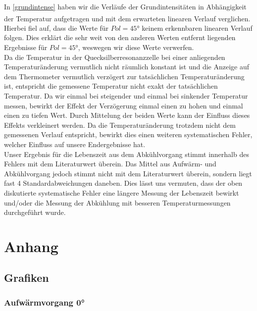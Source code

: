 \documentclass[12pt]{article}
\begin{document}
In \ref{grundintense} haben wir die Verläufe der Grundintensitäten in Abhängigkeit der Temperatur aufgetragen und mit dem erwarteten linearen Verlauf verglichen.\textsuperscript{\cite{HAMAMAMUTSU}} Hierbei fiel auf, dass die Werte für $Pol=45°$ keinem erkennbaren linearen Verlauf folgen. Dies erklärt die sehr weit von den anderen Werten entfernt liegenden Ergebnisse für $Pol=45°$, weswegen wir diese Werte verwerfen.\\

Da die Temperatur in der Quecksilberresonanzzelle bei einer anliegenden Temperaturänderung vermutlich nicht räumlich konstant ist und die Anzeige auf dem Thermometer vermutlich verzögert zur tatsächlichen Temperaturänderung ist, entspricht die gemessene Temperatur nicht exakt der tatsächlichen Temperatur. Da wir einmal bei steigender und einmal bei sinkender Temperatur messen, bewirkt der Effekt der Verzögerung einmal einen zu hohen und einmal einen zu tiefen Wert. Durch Mittelung der beiden Werte kann der Einfluss dieses Effekts verkleinert werden. Da die Temperaturänderung trotzdem nicht dem gemessenen Verlauf entspricht, bewirkt dies einen weiteren systematischen Fehler, welcher Einfluss auf unsere Endergebnisse hat.\\

Unser Ergebnis für die Lebenszeit aus dem Abkühlvorgang stimmt innerhalb des Fehlers mit dem Literaturwert überein. Das Mittel aus Aufwärm- und Abkühlvorgang jedoch stimmt nicht mit dem Literaturwert überein, sondern liegt fast 4 Standardabweichungen daneben. Dies lässt uns vermuten, dass der oben diskutierte systematische Fehler eine längere Messung der Lebenszeit bewirkt und/oder die Messung der Abkühlung mit besseren Temperaturmessungen durchgeführt wurde.
\section{Anhang}

\subsection{Grafiken}\label{bilder}
\subsubsection{Aufwärmvorgang 0°}
\end{document}
